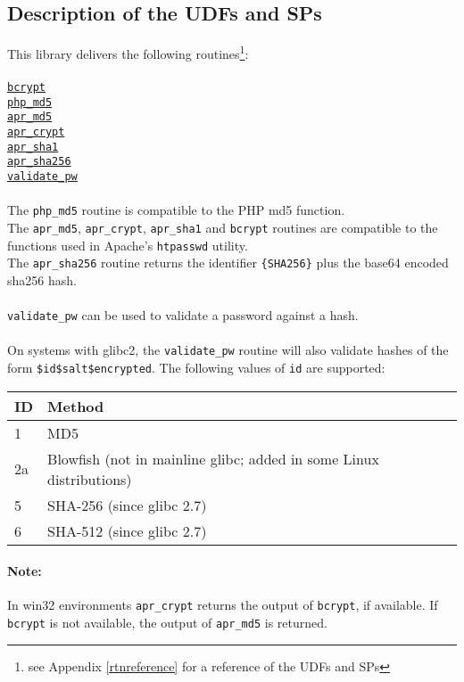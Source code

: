 \subsection{Description of the UDFs and SPs}
This library delivers the following routines\footnote{see Appendix \ref{rtnreference} for a reference of the UDFs and SPs}:\\
\\
\hyperlink{hbcrypt}{\tt bcrypt}\\
\hyperlink{hphpmd5}{\tt php\_md5}\\
\hyperlink{haprmd5}{\tt apr\_md5}\\
\hyperlink{haprcrypt}{\tt apr\_crypt}\\
\hyperlink{haprsha1}{\tt apr\_sha1}\\
\hyperlink{haprsha256}{\tt apr\_sha256}\\
\hyperlink{hvalidatepw}{\tt validate\_pw}\\
\\
The {\tt php\_md5} routine is compatible to the PHP md5 function.\\
The {\tt apr\_md5}, {\tt apr\_crypt}, {\tt apr\_sha1} and {\tt bcrypt} routines are compatible to the functions used in Apache's {\tt htpasswd} utility.\\
The {\tt apr\_sha256} routine returns the identifier {\tt \{SHA256\}} plus the base64 encoded sha256 hash.\\
\\
{\tt validate\_pw} can be used to validate a password against a hash.\\
\\
On systems with glibc2, the {\tt validate\_pw} routine will also validate hashes of the form \mbox{\tt \$id\$salt\$encrypted}. The following values of {\tt id} are supported:\\

\begin{tabular}{l|l}
 ID  &  Method                                                              \\ \hline
1    &  MD5                                                                 \\
2a   &  Blowfish (not in mainline glibc; added in some Linux distributions) \\
5    &  SHA-256 (since glibc 2.7)                                           \\
6    &  SHA-512 (since glibc 2.7)                                           \\
\end{tabular}

\paragraph{Note:}{In win32 environments {\tt apr\_crypt} returns the output of {\tt bcrypt}, if available. If {\tt bcrypt} is not available, the output of {\tt apr\_md5} is returned.}
